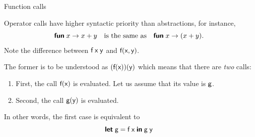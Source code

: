 %
\begin{frame}[fragile]{Function calls}

  Operator calls have higher syntactic priority than abstractions, for
  instance,
  \begin{equation*}
    \textsf{\textbf{fun}} \; x \rightarrow x + y \quad\text{is the same as}\quad
    \textsf{\textbf{fun}} \; x \rightarrow (x + y).
  \end{equation*}
  Note the difference between $\textsf{f} \; \textsf{x} \; \textsf{y}$
  and $\textsf{f}(\textsf{x}, \textsf{y})$.

  \bigskip

  The former is to be understood as
  $(\textsf{f}(\textsf{x}))(\textsf{y})$ which means that there are
  \emph{two} calls:
  \begin{enumerate}

  \item First, the call $\textsf{f}(\textsf{x})$ is evaluated. Let us
    assume that its value is $\textsf{g}$.

  \item Second, the call $\textsf{g}(\textsf{y})$ is evaluated.

  \end{enumerate}

  In other words, the first case is equivalent to
  \begin{equation*}
    \textsf{\textbf{let}}\; \textsf{g} = \textsf{f} \; \textsf{x} \; \textsf{\textbf{in}} \; \textsf{g} \; \textsf{y}
  \end{equation*}

\end{frame}

